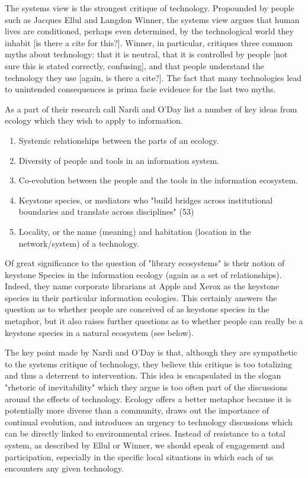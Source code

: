 The systems view is the strongest critique of technology. Propounded by people such as Jacques Ellul and Langdon Winner, the systems view argues that human lives are conditioned, perhaps even determined, by the technological world they inhabit [is there a cite for this?]. Winner, in particular, critiques three common myths about technology: that it is neutral, that it is controlled by people [not sure this is stated correctly, confusing], and that people understand the technology they use [again, is there a cite?]. The fact that many technologies lead to unintended consequences is prima facie evidence for the last two myths.

As a part of their research call Nardi and O'Day list a number of key ideas from ecology which they wish to apply to information.

\begin{enumerate}
\item Systemic relationships between the parts of an ecology.
\item Diversity of people and tools in an information system.
\item Co-evolution between the people and the tools in the information ecosystem.
\item Keystone species, or mediators who "build bridges across institutional boundaries and translate across disciplines" (53)
\item Locality, or the name (meaning) and habitation (location in the network/system) of a technology.
\end{enumerate}

Of great significance to the question of "library ecosystems" is their notion of keystone Species in the information ecology (again as a set of relationships). Indeed, they name corporate librarians at Apple and Xerox as the keystone species in their particular information ecologies. This certainly answers the question as to whether people are conceived of as keystone species in the metaphor, but it also raises further questions as to whether people can really be a keystone species in a natural ecosystem (see below).

The key point made by Nardi and O'Day is that, although they are sympathetic to the systems critique of technology, they believe this critique is too totalizing and thus a deterrent to intervention. This idea is encapsulated in the slogan "rhetoric of inevitability" which they argue is too often part of the discussions around the effects of technology. Ecology offers a better metaphor because it is potentially more diverse than a community, draws out the importance of continual evolution, and introduces an urgency to technology discussions which can be directly linked to environmental crises. Instead of resistance to a total system, as described by Ellul or Winner, we should speak of engagement and participation, especially in the specific local situations in which each of us encounters any given technology.

